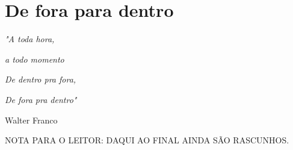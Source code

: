 \chapter{De fora para dentro}

\singlespacing
\begin{flushright}
\textit{"A toda hora,}

\textit{a todo momento}

\textit{De dentro pra fora,}

\textit{De fora pra dentro"}

Walter Franco
\end{flushright}
\doublespacing

NOTA PARA O LEITOR: DAQUI AO FINAL AINDA SÃO RASCUNHOS.





